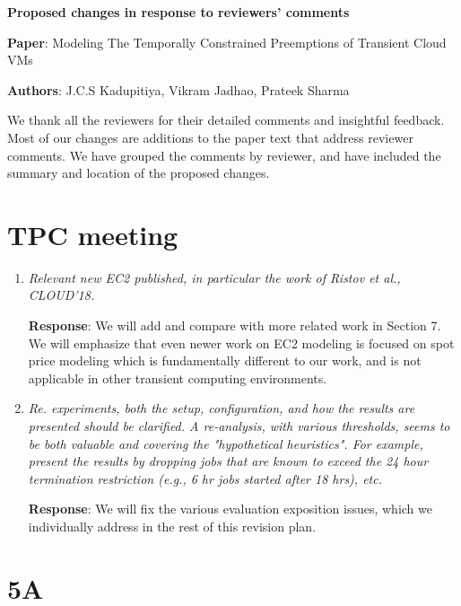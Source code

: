 \documentclass{article}
\newcommand{\resp}[1]{\textbf{Response}: #1}
\newcommand{\revmade}[1]{\textbf{Revision Made}: #1}
\begin{document}
\begin{center}
  \large{\textbf {Proposed changes in response to reviewers'
      comments}}

{\textbf{Paper}:  Modeling The Temporally Constrained Preemptions of Transient Cloud VMs}

{\textbf{Authors}: J.C.S Kadupitiya, Vikram Jadhao, Prateek Sharma}
\end{center}

\date{April 1 2020}

We thank all the reviewers for their detailed comments and insightful feedback.
Most of our changes are additions to the paper text that address reviewer comments. 
We have grouped the comments by reviewer, and have included the summary and location of the proposed changes.

\section{TPC meeting}

\begin{enumerate}

\item \emph{Relevant new EC2 published, in particular the work of Ristov et al., CLOUD'18.}

\resp{We will add and compare with more related work in Section 7. We will emphasize that even newer work on EC2 modeling is focused on spot price modeling which is fundamentally different to our work, and is not applicable in other transient computing environments.}


\item \emph{Re. experiments, both the setup, configuration, and how the results are presented should be clarified. A re-analysis, with various thresholds, seems to be both valuable and covering the "hypothetical heuristics". For example, present the results by dropping jobs that are known to exceed the 24 hour termination restriction (e.g., 6 hr jobs started after 18 hrs), etc.}

\resp{We will fix the various evaluation exposition issues, which we individually address in the rest of this revision plan.}



\end{enumerate}


\section{5A}
\end{document}

